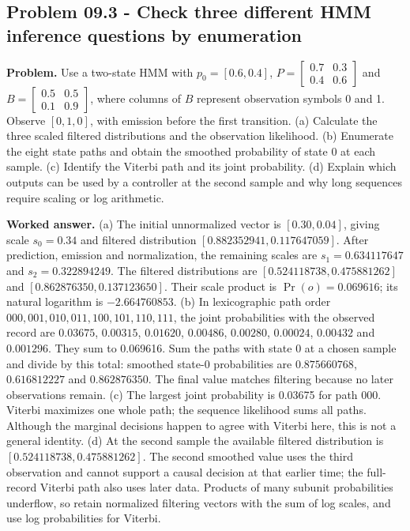 \documentclass[11pt,a4paper]{article}
\begin{document}
\subsection{Problem 09.3 - Check three different HMM inference questions by enumeration}
\textbf{Problem.} Use a two-state HMM with $p_0=[0.6,0.4]$, $P=\left[\begin{smallmatrix}0.7&0.3\\0.4&0.6\end{smallmatrix}\right]$ and $B=\left[\begin{smallmatrix}0.5&0.5\\0.1&0.9\end{smallmatrix}\right]$, where columns of $B$ represent observation symbols 0 and 1. Observe $[0,1,0]$, with emission before the first transition. (a) Calculate the three scaled filtered distributions and the observation likelihood. (b) Enumerate the eight state paths and obtain the smoothed probability of state 0 at each sample. (c) Identify the Viterbi path and its joint probability. (d) Explain which outputs can be used by a controller at the second sample and why long sequences require scaling or log arithmetic.


\textbf{Worked answer.} (a) The initial unnormalized vector is $[0.30,0.04]$, giving scale $s_0=0.34$ and filtered distribution $[0.882352941,0.117647059]$. After prediction, emission and normalization, the remaining scales are $s_1=0.634117647$ and $s_2=0.322894249$. The filtered distributions are $[0.524118738,0.475881262]$ and $[0.862876350,0.137123650]$. Their scale product is $\Pr(o)=0.069616$; its natural logarithm is $-2.664760853$. (b) In lexicographic path order $000,001,010,011,100,101,110,111$, the joint probabilities with the observed record are $0.03675$, $0.00315$, $0.01620$, $0.00486$, $0.00280$, $0.00024$, $0.00432$ and $0.001296$. They sum to 0.069616. Sum the paths with state 0 at a chosen sample and divide by this total: smoothed state-0 probabilities are $0.875660768$, $0.616812227$ and $0.862876350$. The final value matches filtering because no later observations remain. (c) The largest joint probability is 0.03675 for path 000. Viterbi maximizes one whole path; the sequence likelihood sums all paths. Although the marginal decisions happen to agree with Viterbi here, this is not a general identity. (d) At the second sample the available filtered distribution is $[0.524118738,0.475881262]$. The second smoothed value uses the third observation and cannot support a causal decision at that earlier time; the full-record Viterbi path also uses later data. Products of many subunit probabilities underflow, so retain normalized filtering vectors with the sum of log scales, and use log probabilities for Viterbi.
\end{document}
